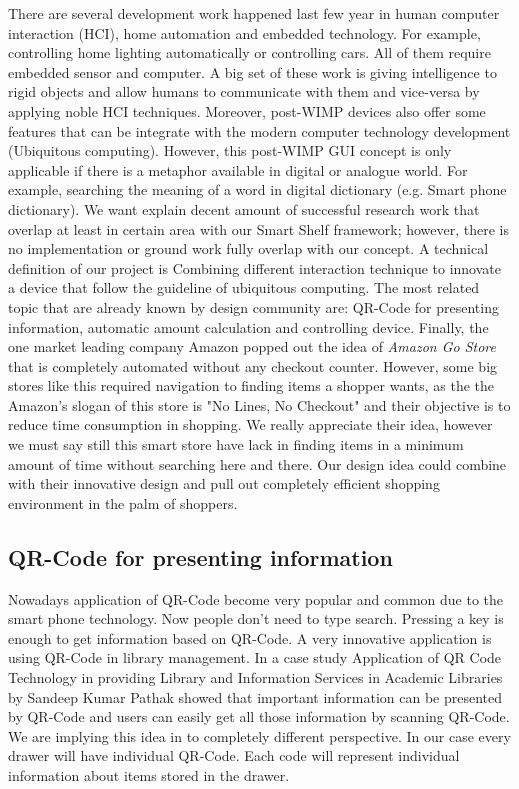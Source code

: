 There are several development work happened last few year in human computer interaction (HCI), home automation and embedded technology\cite{RefWorks:IOTstatistics}. 
For example, controlling home lighting automatically  or controlling cars. All of them require embedded sensor and computer.
A big set of these work is giving intelligence to rigid objects and allow humans to communicate with them and vice-versa by applying noble HCI techniques. 
Moreover, post-WIMP devices also offer some features that can be integrate with the modern computer technology development (Ubiquitous computing). 
However, this post-WIMP GUI concept is only applicable if there is a metaphor available in digital or analogue world. 
For example, searching the meaning of a word in digital dictionary (e.g. Smart phone dictionary).
We want explain decent amount of successful research work that overlap at least in certain area with our Smart Shelf framework; however, there is no implementation or ground work fully overlap with our concept. 
A technical definition of our project is \grqq{}Combining different interaction technique to innovate a device that follow the guideline of ubiquitous computing\grqq{}.
The most related topic that are already known by design community are: QR-Code for presenting information, automatic amount calculation and controlling device. 
Finally, the one market leading company Amazon popped out the idea of \textit{Amazon Go Store} that is completely automated without any checkout counter. 
However, some big stores like this required navigation to finding items a shopper wants, as the the Amazon's slogan of this store is "No Lines, No Checkout" and their objective is to reduce time consumption in shopping. 
We really appreciate their idea, however we must say still this smart store have lack in finding items in a minimum amount of time without searching here and there. 
Our design idea could combine with their innovative design and pull out completely efficient shopping environment in the palm of shoppers. 
 
\subsection{QR-Code for presenting information} 
Nowadays application of QR-Code become very popular and common due to the smart phone technology. 
Now people don't need to type search. 
Pressing a key is enough to get information based on QR-Code. 
A very innovative application is using QR-Code in library management. 
In a case study \grqq{}Application of QR Code Technology in providing Library and Information Services in Academic Libraries\grqq{} \cite{RefWorks:iitgn} by  Sandeep
Kumar Pathak showed that important information can be presented by QR-Code and users can easily get all those information by scanning QR-Code. 
We are implying this idea in to completely different perspective.
In our case every drawer will have individual QR-Code. 
Each code will represent individual information about items stored in the drawer. 

